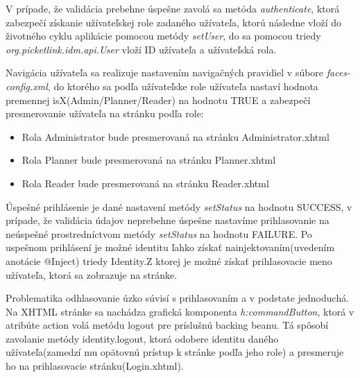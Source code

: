 V prípade, že validácia prebehne úspešne zavolá sa metóda \emph{authenticate}, ktorá zabezpečí získanie užívateľskej role zadaného užívateľa, ktorú následne vloží do životného cyklu aplikácie pomocou metódy \emph{setUser}, do sa pomocou triedy \emph{org.picketlink.idm.api.User} vloží ID užívateľa a užívateľská rola.

Navigácia užívateľa sa realizuje nastavením navigačných pravidiel v súbore \emph{faces-config.xml}, do ktorého sa podľa užívateľske role užívateľa nastaví hodnota premennej isX(Admin/Planner/Reader) na hodnotu TRUE a zabezpečí presmerovanie užívateľa na stránku podľa role:
\begin{itemize}
\item Rola Administrator bude presmerovaná na stránku Administrator.xhtml 
\item Rola Planner bude presmerovaná na stránku Planner.xhtml
\item Rola Reader bude presmerovaná na stránku Reader.xhtml
\end{itemize}

Úspešné prihlásenie je dané nastavení metódy \emph{setStatus} na hodnotu SUCCESS, v prípade, že validácia údajov neprebehne úspešne nastavíme prihlasovanie na neúspešné prostredníctvom metódy \emph{setStatus} na hodnotu FAILURE. Po uspešnom prihlásení je možné identitu ľahko získať nainjektovaním(uvedením anotácie @Inject) triedy Identity.Z ktorej je možné získať prihlasovacie meno užívateľa, ktorá sa zobrazuje na stránke.

Problematika odhlasovanie úzko súvisí s prihlasovaním a v podstate jednoduchá. Na XHTML stránke sa nachádza grafická komponenta \emph{h:commandButton}, ktorá v atribúte action volá metódu logout pre príslušnú backing beanu. Tá spôsobí zavolanie metódy identity.logout, ktorá odobere identitu daného užívateľa(zamedzí mu opätovnú prístup k stránke podľa jeho role) a presmeruje ho na prihlasovacie stránku(Login.xhtml).

